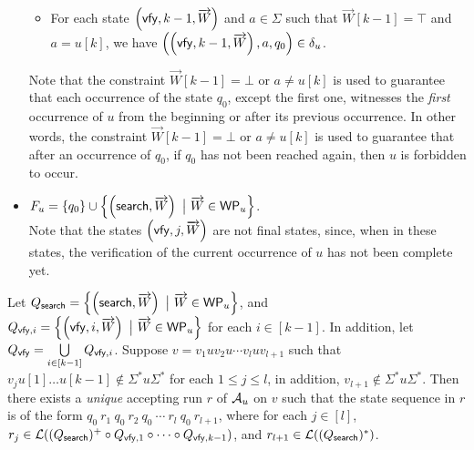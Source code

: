 \begin{definition}
\begin{itemize}
\begin{itemize}
		\item For each state $\left(\mathsf{vfy}, k-1, \overrightarrow{W} \right)$ and $a \in \Sigma$ such that $\overrightarrow{W}[k-1]=\top$ and $a  = u[k]$, we have $\left(\left(\mathsf{vfy}, k-1, \overrightarrow{W} \right), a, q_0\right) \in \delta_u$.
	\end{itemize}
Note that the constraint $\overrightarrow{W}[k-1] = \bot$ or $a \neq u[k]$ is used to guarantee that each occurrence of the state $q_0$, except the first one, witnesses the \emph{first} occurrence of $u$ from the beginning or after its previous occurrence. In other words, the constraint $\overrightarrow{W}[k-1] = \bot$ or $a \neq u[k]$ is used to guarantee that after an occurrence of $q_0$, if $q_0$ has not been reached again,  then $u$ is forbidden to occur.

	\item $F_u= \left\{q_0 \right\} \cup \left\{\left(\search, \overrightarrow{W} \right)\ \big\vert\ \overrightarrow{W} \in \wprof_{u} \right\} $. \\
	Note that the states $\left(\mathsf{vfy}, j, \overrightarrow{W} \right)$ are not final states, since, when in these states, the verification of the current occurrence of $u$ has not been complete yet.
\end{itemize}
\end{definition}

Let $Q_{\mathsf{search}}  = \left\{ \left(\mathsf{search}, \overrightarrow{W} \right) \ \big\vert\ \overrightarrow{W} \in \mathsf{WP}_{u} \right\}$,  and $Q_{\verify, i} = \left\{ \left(\verify, i, \overrightarrow{W} \right) \ \big\vert\ \overrightarrow{W} \in \wprof_{u} \right\}$ for each $i \in [k-1]$. In addition, let $Q_{\mathsf{vfy}} = \bigcup \limits_{i \in [k-1]} Q_{\mathsf{vfy},i}$.
Suppose $v = v_1 u v_2 u \cdots v_l u v_{l+1}$ such that $v_j u[1] \dots u[k-1] \not \in \Sigma^\ast u \Sigma^\ast$ for each $1 \le j \le l$, in addition, $v_{l+1} \not \in \Sigma^\ast u \Sigma^\ast$. Then there exists a \emph{unique} accepting run $r$ of $\mathcal{A}_u$ on $v$ such that the state sequence in $r$ is of the form
$q_0\ r_1\ q_0\ r_2\ q_0\ \cdots\ r_l\ q_0\ r_{l+1}$, where for each $j \in [l]$, $r_j \in  \mathcal{L}((Q_{\mathsf{search}})^+ \circ Q_{\mathsf{vfy}, 1} \circ \cdots  \circ Q_{\mathsf{vfy}, k-1})$, and $r_{l+1} \in \mathcal{L}((Q_{\mathsf{search}})^*)$. 

